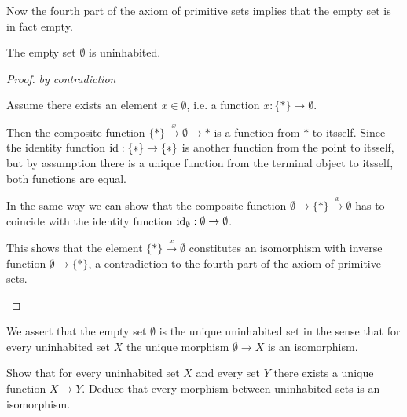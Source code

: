 \documentclass{article}
\begin{document}
	Now the fourth part of the axiom of primitive sets implies that the empty set is in fact empty.

	\begin{lemma}
		\label{lemEmptyUninhabited}
		The empty set $\emptyset$ is uninhabited.
	\end{lemma}
	\begin{proof}
		\textit{by contradiction}

		Assume there exists an element $x\in\emptyset$, i.e. a function $x:\{\ast\} \rightarrow \emptyset$.
		\begin{tab}
			Then the composite function $\{\ast\} \xrightarrow{x} \emptyset \rightarrow \ast$ is a function from $\ast$ to itsself. Since the identity function $\operatorname{id}:\{\ast\}\rightarrow\{\ast\}$ is another function from the point to itsself, but by assumption there is a unique function from the terminal object to itsself, both functions are equal.

			In the same way we can show that the composite function $\emptyset \rightarrow \{\ast\} \xrightarrow{x} \emptyset$ has to coincide with the identity function $\operatorname{id}_\emptyset:\emptyset \rightarrow \emptyset$.

			This shows that the element $\{\ast\} \xrightarrow{x} \emptyset$ constitutes an isomorphism with inverse function $\emptyset \rightarrow \{\ast\}$, a contradiction to the fourth part of the axiom of primitive sets.\vspace{-1.5em}
		\end{tab}
	\end{proof}


	\begin{axiom}
		We assert that the empty set $\emptyset$ is the unique uninhabited set in the sense that for every uninhabited set $X$ the unique morphism $\emptyset \rightarrow X$ is an isomorphism.
	\end{axiom}

	\begin{exercise}
		\label{excUninhabitedIsInitial}
		Show that for every uninhabited set $X$ and every set $Y$ there exists a unique function $X \rightarrow Y$. Deduce that every morphism between uninhabited sets is an isomorphism.
	\end{exercise}


\end{document}
